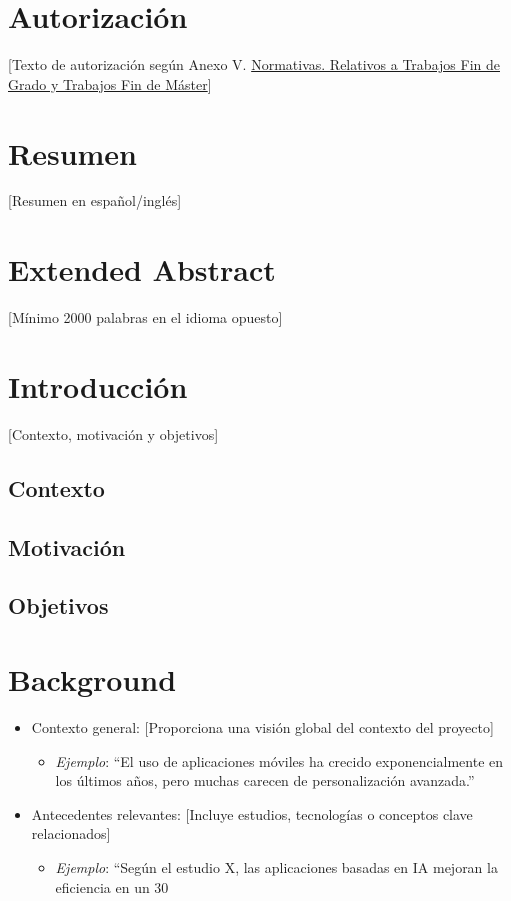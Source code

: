 \documentclass[12pt, a4paper]{article}
\begin{document}
\newpage
\section*{Autorización}
[Texto de autorización según Anexo V.  \href{https://www.um.es/web/informatica/conoce-la-facultad/normativa}{Normativas. Relativos a Trabajos Fin de Grado y Trabajos Fin de Máster}]

\newpage
\section*{Resumen}
  [Resumen en español/inglés]

\section*{Extended Abstract}
[Mínimo 2000 palabras en el idioma opuesto]

\newpage
\tableofcontents

\newpage
\section{Introducción}
[Contexto, motivación y objetivos]
\subsection{Contexto}
\subsection{Motivación}
\subsection{Objetivos}

\section{Background}

\begin{itemize}
    \item Contexto general: [Proporciona una visión global del contexto del proyecto]
    \begin{itemize}
        \item \textit{Ejemplo}: “El uso de aplicaciones móviles ha crecido exponencialmente en los últimos años, pero muchas carecen de personalización avanzada.”
    \end{itemize}
    \item Antecedentes relevantes: [Incluye estudios, tecnologías o conceptos clave relacionados]
    \begin{itemize}
        \item \textit{Ejemplo}: “Según el estudio X, las aplicaciones basadas en IA mejoran la eficiencia en un 30%

    \end{itemize}
\end{itemize}   
\end{document}
